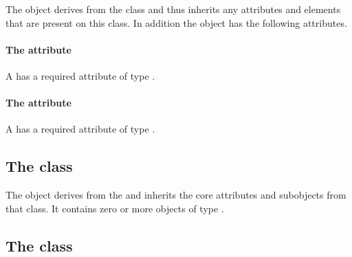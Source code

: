 
The \Boundary object derives from the \SBase class and thus inherits any
attributes and elements that are present on this class.
In addition the \Boundary object has the following attributes.

\paragraph{The \fixttspace{} attribute}

A \Boundary has a required attribute  of type .


\paragraph{The \fixttspace{} attribute}

A \Boundary has a required attribute  of type
.


\subsection{The  class}
\label{listofadjacentdomains-class}


The \ListOfAdjacentDomains object derives from the  and
inherits the core attributes and subobjects from that class. It contains
zero or more objects of type \AdjacentDomains.

\subsection{The  class}
\label{adjacentdomains-class}




